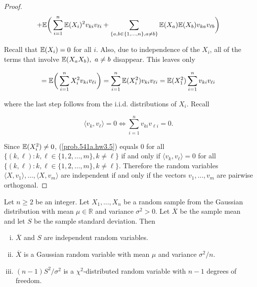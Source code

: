 \begin{proof}
\[  
+   \E  \bigg(  \sum_{i=1}^n \E(X_i)^2 v_{ki} v_{\ell i} + \sum_{\{a, b \in \{1, \ldots, n\},a \neq b \} }   \E(X_a) \E(X_b) v_{ka}  v_{\ell b} \bigg)
\]

Recall that \(\E(X_i)= 0\) for all \(i\). Also, due to independence of the \(X_i\), all of the terms that involve \(\E (X_a X_b), \ a \neq b\) disappear. This leaves only

 \begin{equation}\label{prob.541a.hw3.5}
= \E \bigg(  \sum_{i=1}^n X_i^2 v_{ki} v_{\ell i} \bigg) = \sum_{i=1}^n  \E (X_i^2 ) v_{ki} v_{\ell i}  = \E (X_1^2 ) \sum_{i=1}^n   v_{ki} v_{\ell i} 
\end{equation}

where the last step follows from the i.i.d. distributions of \(X_i\). Recall

\[
\langle v_k, v_\ell \rangle = 0 \iff  \sum_{i=1}^n   v_{ki} v_{\ell i}  = 0.
\]

Since \(\E(X_i^2) \neq 0\), (\ref{prob.541a.hw3.5}) equals 0 for all \( \{(k, \ell) : k, \ell \in \{1, 2, \ldots, m\}, k \neq \ell \}\) if and only if \(\langle v_k, v_\ell \rangle = 0 \) for all \( \{(k, \ell) : k, \ell \in \{1, 2, \ldots, m\}, k \neq \ell \}\). Therefore the random variables $\langle X, v_1 \rangle, \dots, \langle X, v_m \rangle$ are independent if and only if the vectors $v_1,\dots,v_m$ are pairwise orthogonal.

\end{proof}

\begin{proposition} Let \(n \geq 2\) be an integer. Let \(X_1, \ldots, X_n\) be a random sample from the Gaussian distribution with mean \(\mu \in \mathbb{R}\) and variance \(\sigma^2 > 0\). Let \(\overline{X}\) be the sample mean and let \(S\) be the sample standard deviation. Then

\begin{enumerate}[(i)]

\item \(\overline{X}\) and \(S\) are independent random variables.

\item \(\overline{X}\) is a Gaussian random variable with mean \(\mu\) and variance \(\sigma^2/n\).

\item \((n-1)S^2/\sigma^2\) is a \(\chi^2\)-distributed random variable with \(n-1\) degrees of freedom.

\end{enumerate}

\end{proposition}

